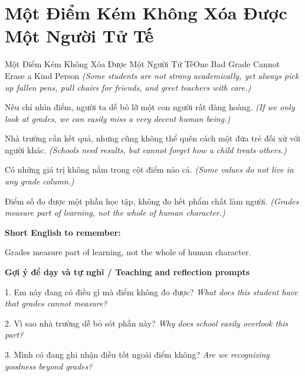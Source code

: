 \section{Một Điểm Kém Không Xóa Được Một Người Tử Tế}
\begin{truyen}{Một Điểm Kém Không Xóa Được Một Người Tử Tế}{One Bad Grade Cannot Erase a Kind Person}
\textit{(Some students are not strong academically, yet always pick up fallen pens, pull chairs for friends, and greet teachers with care.)}

Nếu chỉ nhìn điểm, người ta dễ bỏ lỡ một con người rất đàng hoàng.
\textit{(If we only look at grades, we can easily miss a very decent human being.)}

Nhà trường cần kết quả, nhưng cũng không thể quên cách một đứa trẻ đối xử với người khác.
\textit{(Schools need results, but cannot forget how a child treats others.)}

Có những giá trị không nằm trong cột điểm nào cả.
\textit{(Some values do not live in any grade column.)}

\end{truyen}

\begin{baihoc}
Điểm số đo được một phần học tập, không đo hết phẩm chất làm người.
\textit{(Grades measure part of learning, not the whole of human character.)}
\end{baihoc}

\begin{ghinhoanh}
\textbf{Short English to remember:}

Grades measure part of learning, not the whole of human character.

\end{ghinhoanh}

\begin{tuhocnhanh}
\textbf{Gợi ý để dạy và tự nghĩ / Teaching and reflection prompts}

1. Em này đang có điều gì mà điểm không đo được? \textit{What does this student have that grades cannot measure?}

2. Vì sao nhà trường dễ bỏ sót phần này? \textit{Why does school easily overlook this part?}

3. Mình có đang ghi nhận điều tốt ngoài điểm không? \textit{Are we recognizing goodness beyond grades?}
\end{tuhocnhanh}
\ngancach


